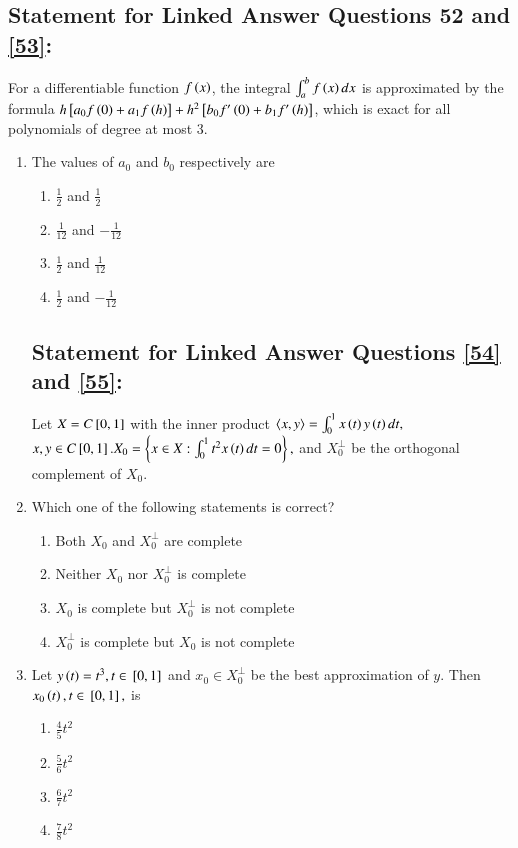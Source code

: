 \documentclass[journal]{IEEEtran}
\begin{document}
\subsection*{Statement for Linked Answer Questions 52 and \ref{53}:}
    For a differentiable function $f\left(x\right)$, the integral $\int_{a}^{b} f\left(x\right)dx $ is approximated by the formula $h{}\left[ a_0 f\left(0\right) + a_1 f\left(h\right)\right] + h^2 {}\left[b_0 f^{\prime}\left(0\right) + b_1 f^{\prime}\left(h\right)\right]$, which is exact for all polynomials of degree at most $3$.
\begin{enumerate}


    \item \label{53}  The values of $a_0$ and $b_0$ respectively are 
        \begin{enumerate}
            \item $\frac{1}{2}$ and $\frac{1}{2}$
            \item $\frac{1}{12}$ and $-\frac{1}{12}$
            \item $\frac{1}{2}$ and $\frac{1}{12}$
            \item $\frac{1}{2}$ and $-\frac{1}{12}$
        \end{enumerate}

    \subsection*{Statement for Linked Answer Questions \ref{54} and \ref{55}:}
    Let $X = C{}\left[0,1\right]$ with the inner product $\langle x,y \rangle = \int_{0}^{1} x\left(t\right) y\left(t\right) dt,$ $x,y \in C{}\left[0,1\right]. X_0 = \left\{ x \in X : 
    \int_0^1 t^2 x \left(t\right) dt = 0\right\},$ and $X_0^{\perp}$ be the orthogonal complement of $X_0$.

    \item \label{54} Which one of the following statements is correct?
        \begin{enumerate}
            \item Both $X_0$ and $X_0^{\perp}$ are complete
            \item Neither $X_0$ nor $X_0^{\perp}$ is complete
            \item $X_0$ is complete but $X_0^{\perp}$ is not complete
            \item $X_0^{\perp}$ is complete but $X_0$ is not complete
        \end{enumerate}

    \item \label{55} Let $y\left(t\right) = t^3, t \in {}\left[0,1\right]$ and $x_0 \in X_0^{\perp}$ be the best approximation of $y$. Then $x_0\left(t\right), t \in {}\left[0,1\right],$ is
        \begin{enumerate}
            \item $\frac{4}{5} t^2$
            \item $\frac{5}{6} t^2$
            \item $\frac{6}{7} t^2$
            \item $\frac{7}{8} t^2$
        \end{enumerate}


\end{enumerate}
\end{document}
